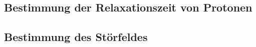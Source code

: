 \documentclass[paper=a4,
	fontsize=10pt,
	DIV=18,
	twocolumn,
	parskip=half
	]{scrartcl}
\numberwithin{equation}{section}    %
\begin{document}
\subsection{Bestimmung der Relaxationszeit von Protonen}
\label{auswertung7}

\subsection{Bestimmung des Störfeldes}
\label{auswertung8}



%
\end{document}
